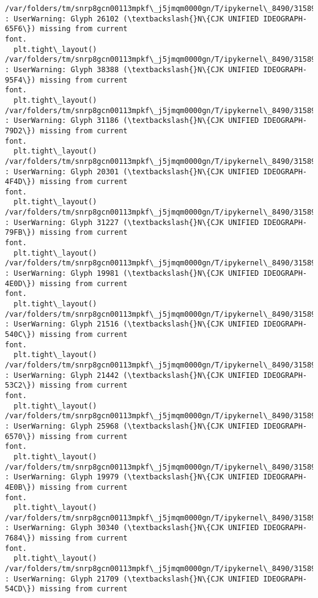 \documentclass[11pt]{article}
\begin{document}
    \begin{Verbatim}[commandchars=\\\{\}]
/var/folders/tm/snrp8gcn00113mpkf\_j5jmqm0000gn/T/ipykernel\_8490/3158952429.py:35
: UserWarning: Glyph 26102 (\textbackslash{}N\{CJK UNIFIED IDEOGRAPH-65F6\}) missing from current
font.
  plt.tight\_layout()
/var/folders/tm/snrp8gcn00113mpkf\_j5jmqm0000gn/T/ipykernel\_8490/3158952429.py:35
: UserWarning: Glyph 38388 (\textbackslash{}N\{CJK UNIFIED IDEOGRAPH-95F4\}) missing from current
font.
  plt.tight\_layout()
/var/folders/tm/snrp8gcn00113mpkf\_j5jmqm0000gn/T/ipykernel\_8490/3158952429.py:35
: UserWarning: Glyph 31186 (\textbackslash{}N\{CJK UNIFIED IDEOGRAPH-79D2\}) missing from current
font.
  plt.tight\_layout()
/var/folders/tm/snrp8gcn00113mpkf\_j5jmqm0000gn/T/ipykernel\_8490/3158952429.py:35
: UserWarning: Glyph 20301 (\textbackslash{}N\{CJK UNIFIED IDEOGRAPH-4F4D\}) missing from current
font.
  plt.tight\_layout()
/var/folders/tm/snrp8gcn00113mpkf\_j5jmqm0000gn/T/ipykernel\_8490/3158952429.py:35
: UserWarning: Glyph 31227 (\textbackslash{}N\{CJK UNIFIED IDEOGRAPH-79FB\}) missing from current
font.
  plt.tight\_layout()
/var/folders/tm/snrp8gcn00113mpkf\_j5jmqm0000gn/T/ipykernel\_8490/3158952429.py:35
: UserWarning: Glyph 19981 (\textbackslash{}N\{CJK UNIFIED IDEOGRAPH-4E0D\}) missing from current
font.
  plt.tight\_layout()
/var/folders/tm/snrp8gcn00113mpkf\_j5jmqm0000gn/T/ipykernel\_8490/3158952429.py:35
: UserWarning: Glyph 21516 (\textbackslash{}N\{CJK UNIFIED IDEOGRAPH-540C\}) missing from current
font.
  plt.tight\_layout()
/var/folders/tm/snrp8gcn00113mpkf\_j5jmqm0000gn/T/ipykernel\_8490/3158952429.py:35
: UserWarning: Glyph 21442 (\textbackslash{}N\{CJK UNIFIED IDEOGRAPH-53C2\}) missing from current
font.
  plt.tight\_layout()
/var/folders/tm/snrp8gcn00113mpkf\_j5jmqm0000gn/T/ipykernel\_8490/3158952429.py:35
: UserWarning: Glyph 25968 (\textbackslash{}N\{CJK UNIFIED IDEOGRAPH-6570\}) missing from current
font.
  plt.tight\_layout()
/var/folders/tm/snrp8gcn00113mpkf\_j5jmqm0000gn/T/ipykernel\_8490/3158952429.py:35
: UserWarning: Glyph 19979 (\textbackslash{}N\{CJK UNIFIED IDEOGRAPH-4E0B\}) missing from current
font.
  plt.tight\_layout()
/var/folders/tm/snrp8gcn00113mpkf\_j5jmqm0000gn/T/ipykernel\_8490/3158952429.py:35
: UserWarning: Glyph 30340 (\textbackslash{}N\{CJK UNIFIED IDEOGRAPH-7684\}) missing from current
font.
  plt.tight\_layout()
/var/folders/tm/snrp8gcn00113mpkf\_j5jmqm0000gn/T/ipykernel\_8490/3158952429.py:35
: UserWarning: Glyph 21709 (\textbackslash{}N\{CJK UNIFIED IDEOGRAPH-54CD\}) missing from current

\end{Verbatim}
\end{document}
